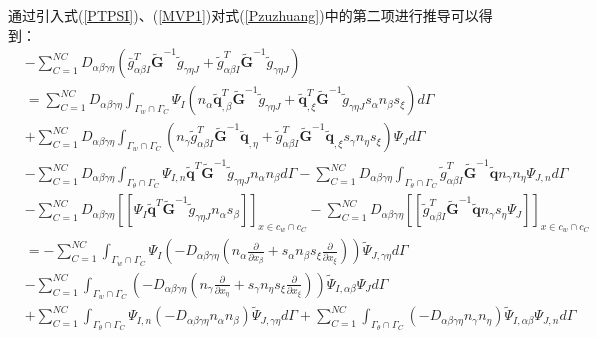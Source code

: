 通过引入式(\ref{PTPSI})、(\ref{MVP1})对式(\ref{Pzuzhuang})中的第二项进行推导可以得到：
\begin{equation}
\begin{split}
    &-\sum_{C=1}^{N\!C}D_{\alpha\beta\gamma\eta}(\bar{g}_{\alpha\beta I}^T\tilde{\pmb G}^{-1}\tilde{g}_{\gamma\eta J}+\tilde{g}_{\alpha\beta I}^T\tilde{\pmb G}^{-1}\tilde{g}_{\gamma\eta J})\\
    &=\sum_{C=1}^{N\!C}D_{\alpha\beta\gamma\eta}\int_{{\Gamma_w}\cap{\Gamma_C}}\Psi_I(n_{\alpha}
    \tilde{\pmb q}_{,\beta}^T\tilde{\pmb G}^{-1}\tilde{g}_{\gamma\eta J}+\tilde{\pmb q}_{,\xi}^T\tilde{\pmb G}^{-1}\tilde{g}_{\gamma\eta J}s_{\alpha}n_{\beta}s_{\xi})d\Gamma\\
    &+\sum_{C=1}^{N\!C}D_{\alpha\beta\gamma\eta}\int_{{\Gamma_w}\cap{\Gamma_C}}(n_{\gamma}
    \tilde{g}_{\alpha\beta I}^T\tilde{\pmb G}^{-1}\tilde{\pmb q}_{,\eta}+\tilde{g}_{\alpha\beta I}^T
    \tilde{\pmb G}^{-1}\tilde{\pmb q}_{,\xi}s_{\gamma}n_{\eta}s_{\xi})\Psi_Jd\Gamma\\
    &-\sum_{C=1}^{N\!C}D_{\alpha\beta\gamma\eta}\int_{{\Gamma_{\theta}}\cap{\Gamma_C}}\Psi_{I,n}
    \tilde{\pmb q}^T\tilde{\pmb G}^{-1}\tilde{g}_{\gamma\eta J}n_{\alpha}n_{\beta}d\Gamma
    -\sum_{C=1}^{N\!C}D_{\alpha\beta\gamma\eta}\int_{{\Gamma_{\theta}}\cap{\Gamma_C}}
    \tilde{g}_{\alpha\beta I}^T\tilde{\pmb G}^{-1}\tilde{\pmb q}n_{\gamma}n_{
    \eta}\Psi_{J,n}d\Gamma\\
    &-\sum_{C=1}^{N\!C}D_{\alpha\beta\gamma\eta}[[\Psi_I\tilde{\pmb q}^T\tilde{\pmb G}^{-1}\tilde{g}_{\gamma\eta J}n_{\alpha}s_{\beta}]]_{x\in{c_w}\cap{c_C}}
    -\sum_{C=1}^{N\!C}D_{\alpha\beta\gamma\eta}[[\tilde{g}_{\alpha\beta I}^T\tilde{\pmb G}^{-1}\tilde{\pmb q}n_{\gamma}s_{\eta}\Psi_J]]_{x\in{c_w}\cap{c_C}}\\
    &=-\sum_{C=1}^{N\!C}\int_{{\Gamma_w}\cap{\Gamma_C}}\Psi_I(-D_{\alpha\beta\gamma\eta}(n_{\alpha}\frac{\partial}{\partial x_{\beta}}+s_{\alpha}n_{\beta}s_{\xi}\frac{\partial}{\partial x_{\xi}}))\tilde{\Psi}_{J,\gamma\eta}d\Gamma\\
    &-\sum_{C=1}^{N\!C}\int_{{\Gamma_w}\cap{\Gamma_C}}(-D_{\alpha\beta\gamma\eta}(n_{\gamma}\frac{\partial}{\partial x_{\eta}}+s_{\gamma}n_{\eta}s_{\xi}\frac{\partial}{\partial x_{\xi}}))\tilde{\Psi}_{I,\alpha\beta}\Psi_Jd\Gamma\\
    &+\sum_{C=1}^{N\!C}\int_{{\Gamma_{\theta}}\cap{\Gamma_C}}\Psi_{I,n}(-D_{\alpha\beta\gamma\eta}n_{\alpha}n_{\beta})\tilde{\Psi}_{J,\gamma\eta}d\Gamma
    +\sum_{C=1}^{N\!C}\int_{{\Gamma_{\theta}}\cap{\Gamma_C}}(-D_{\alpha\beta\gamma\eta}n_{\gamma}n_{\eta})\tilde{\Psi}_{I,\alpha\beta}\Psi_{J,n}d\Gamma\\

\end{split}
\end{equation}
